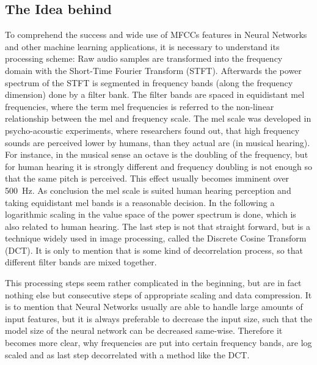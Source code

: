 \subsection{The Idea behind}
To comprehend the success and wide use of MFCCs features in Neural Networks and other machine learning applications, it is necessary to understand its processing scheme:
Raw audio samples are transformed into the frequency domain with the Short-Time Fourier Transform (STFT).
Afterwards the power spectrum of the STFT is segmented in frequency bands (along the frequency dimension) done by a filter bank.
The filter bands are spaced in equidistant mel frequencies,
where the term mel frequencies is referred to the non-linear relationship between the mel and frequency scale.
The mel scale was developed in psycho-acoustic experiments, where researchers found out, that high frequency sounds are perceived lower by humans, than they actual are (in musical hearing). For instance, in the musical sense an octave is the doubling of the frequency, but for human hearing it is strongly different and frequency doubling is not enough so that the same pitch is perceived.
This effect usually becomes imminent over \SI{500}{\hertz}.
As conclusion the mel scale is suited human hearing perception and taking equidistant mel bands is a reasonable decision.
In the following a logarithmic scaling in the value space of the power spectrum is done, which is also related to human hearing.
The last step is not that straight forward, but is a technique widely used in image processing, called the Discrete Cosine Transform (DCT).
It is only to mention that is some kind of decorrelation process, so that different filter bands are mixed together.

This processing steps seem rather complicated in the beginning, but are in fact nothing else but consecutive steps of appropriate scaling and data compression.
It is to mention that Neural Networks usually are able to handle large amounts of input features, but it is always preferable to decrease the input size, such that the model size of the neural network can be decreased same-wise.
Therefore it becomes more clear, why frequencies are put into certain frequency bands, are log scaled and as last step decorrelated with a method like the DCT.

